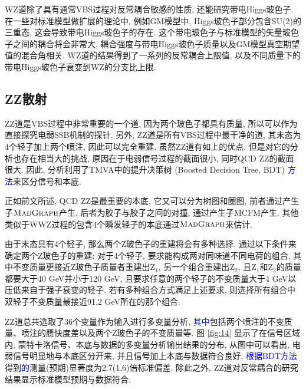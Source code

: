 \documentclass{SCIS2020cn}
\newcommand{\MADGRAPH}{\textsc{MadGraph}\xspace}
\newcommand{\Zboson}{\text{Z}}
\newcommand{\add}{\textcolor{blue}}
\begin{document}
WZ道除了具有通常VBS过程对反常耦合敏感的性质, 还能研究带电Higgs玻色子. 在一些对标准模型做扩展的理论中, 例如GM模型中, Higgs玻色子部分包含SU(2)的三重态, 这会导致带电Higgs玻色子的存在. 这个带电玻色子与标准模型的矢量玻色子之间的耦合将会非常大, 耦合强度与带电Higgs玻色子质量以及GM模型真空期望值的混合角相关. WZ道的结果得到了一系列的反常耦合上限值, 以及不同质量下的带电Higgs玻色子衰变到WZ的分支比上限. 

\subsection{ZZ散射}

ZZ道是VBS过程中非常重要的一个道, 因为两个玻色子都具有质量, 所以可以作为直接探究电弱SSB机制的探针. 另外, ZZ道是所有VBS过程中最干净的道, 其末态为4个轻子加上两个喷注, 因此可以完全重建. 虽然ZZ道有如上的优点, 但是对它的分析也存在相当大的挑战, 原因在于电弱信号过程的截面很小, 同时QCD ZZ的截面很大. 因此, 分析利用了TMVA中的提升决策树 (Boosted Decision Tree, BDT) \add{方法}来区分信号和本底. 

正如前文所述, QCD ZZ是最重要的本底, 它又可以分为树图和圈图, 前者通过产生子$\MADGRAPH$产生, 后者为胶子与胶子之间的对撞, 通过产生子MCFM产生. 其他类似于WWZ过程的包含4个瞬发轻子的本底通过$\MADGRAPH$来估计. 

由于末态具有4个轻子, 那么两个Z玻色子的重建将会有多种选择. 通过以下条件来确定两个Z玻色子的重建: 对于4个轻子, 要求能构成两对同味道不同电荷的组合, 其中不变质量更接近Z玻色子质量者重建出$\Zboson_1$, 另一个组合重建出$\Zboson_2$, 且$\Zboson_1$和$\Zboson_2$的质量都要大于40
GeV并小于120 GeV, 且要求任意的两个轻子的不变质量大于4 GeV以压低来自于强子衰变的轻子. 若有多种组合方式满足上述要求, 则选择所有组合中双轻子不变质量最接近91.2 GeV所在的那个组合. 

ZZ道总共选取了36个变量作为输入进行多变量分析, \add{其中}包括两个喷注的不变质量、喷注的赝快度差以及两个Z玻色子的不变质量等. 图 \ref{fig:14} 显示了在信号区域内, 蒙特卡洛信号、本底与数据的多变量分析输出结果的分布, 从图中可以看出, 电弱信号明显地与本底区分开来, 并且信号加上本底与数据符合良好. \add{根据BDT方法}得到\add{的}测量(预期)显著度为2.7(1.6)倍标准偏差. 除此之外, ZZ道对反常耦合的研究结果显示标准模型预期与数据符合. 
\end{document}
